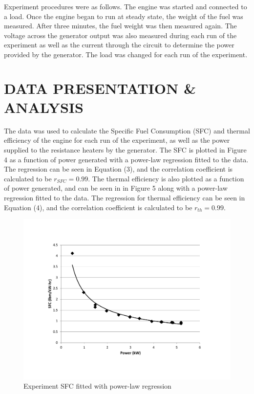 \documentclass[12pt]{article}
\begin{document}
Experiment procedures were as follows. The engine was started and connected to a load. Once the engine began to run at steady state, the weight of the fuel was measured. After three minutes, the fuel weight was then measured again. The voltage across the generator output was also measured during each run of the experiment as well as the current through the circuit to determine the power provided by the generator. The load was changed for each run of the experiment.

\section*{\fontsize{12}{12}\selectfont DATA PRESENTATION \& ANALYSIS}
The data was used to calculate the Specific Fuel Consumption (SFC) and thermal efficiency of the engine for each run of the experiment, as well as the power supplied to the resistance heaters by the generator. The SFC is plotted in Figure 4 as a function of power generated with a power-law regression fitted to the data. The regression can be seen in Equation (3), and the correlation coefficient is calculated to be $r_{SFC}=0.99$. The thermal efficiency is also plotted as a function of power generated, and can be seen in in Figure 5 along with a power-law regression fitted to the data. The regression for thermal efficiency can be seen in Equation (4), and the correlation coefficient is calculated to be $r_{th} = 0.99$.
\bigskip

\begin{figure}[t!] %
   \centering
   \includegraphics[width=5in]{SFC_plot.pdf} 
   \caption{Experiment SFC fitted with power-law regression}
   \label{fig:example}
\end{figure}
\end{document}
